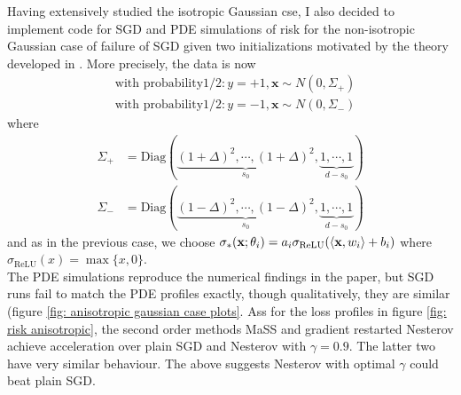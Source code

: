 \documentclass{article}
\begin{document}
Having extensively studied the isotropic Gaussian cse, I also decided to implement code for SGD and PDE simulations of risk for the non-isotropic Gaussian case of failure of SGD given two initializations motivated by the theory developed in \cite{Mei_2018}. More precisely, the data is now 
\begin{equation}
\begin{array}{cc}
& \text{with probability}  1/2: y = +1, \mathbf{x}\sim N(0, \Sigma_+)\\
& \text{with probability}  1/2: y = -1, \mathbf{x}\sim N(0, \Sigma_-)
\end{array}
\end{equation}
where 
\begin{equation}
\begin{array}{cc}
	\Sigma_+ &= \text{Diag}(\underbrace{(1+\Delta)^{2}, \cdots, (1+\Delta)^{2}}_{s_0}, \underbrace{1,\cdots, 1}_{d-s_0})\\ 
 \Sigma_- &= \text{Diag}(\underbrace{(1-\Delta)^{2}, \cdots, (1-\Delta)^{2}}_{s_0}, \underbrace{1,\cdots, 1}_{d-s_0})
\end{array}
\end{equation}
and as in the previous case, we choose $\sigma_*(\mathbf{x};\mathbf{\theta}_{i})=a_{i}\sigma_{\text{ReLU}}(\langle \mathbf{x}, w_{i}\rangle+b_{i})$  where $ \sigma_{\text{ReLU}}(x) = \max\{x,0\}$.\\ 

The PDE simulations reproduce the numerical findings in the paper, but SGD runs fail to match the PDE profiles exactly, though qualitatively, they are similar (figure \ref{fig: anisotropic gaussian case plots}. Ass for the loss profiles in figure \ref{fig: risk anisotropic}, the second order methods MaSS and gradient restarted Nesterov achieve acceleration over plain SGD and Nesterov with $ \gamma = 0.9$. The latter two have very similar behaviour. The above suggests Nesterov with optimal $ \gamma$ could beat plain SGD.
\end{document}

